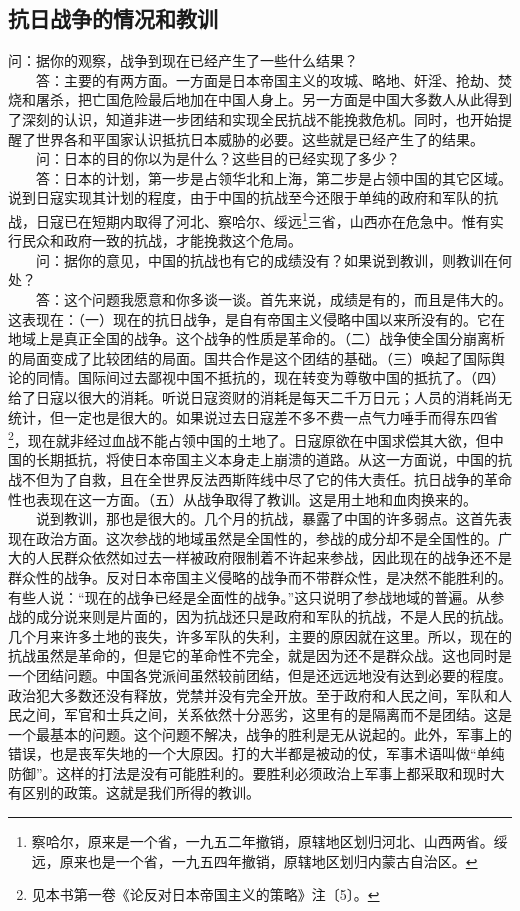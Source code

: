 \documentclass[cn,11pt,chinese]{elegantbook}
\def\myformat#1{\hfil\hfil #1}
\begin{document}
\subsection*{\myformat{抗日战争的情况和教训}}
问：据你的观察，战争到现在已经产生了一些什么结果？\\
　　答：主要的有两方面。一方面是日本帝国主义的攻城、略地、奸淫、抢劫、焚烧和屠杀，把亡国危险最后地加在中国人身上。另一方面是中国大多数人从此得到了深刻的认识，知道非进一步团结和实现全民抗战不能挽救危机。同时，也开始提醒了世界各和平国家认识抵抗日本威胁的必要。这些就是已经产生了的结果。\\
　　问：日本的目的你以为是什么？这些目的已经实现了多少？\\
　　答：日本的计划，第一步是占领华北和上海，第二步是占领中国的其它区域。说到日寇实现其计划的程度，由于中国的抗战至今还限于单纯的政府和军队的抗战，日寇已在短期内取得了河北、察哈尔、绥远\footnote[2]{ 察哈尔，原来是一个省，一九五二年撤销，原辖地区划归河北、山西两省。绥远，原来也是一个省，一九五四年撤销，原辖地区划归内蒙古自治区。}三省，山西亦在危急中。惟有实行民众和政府一致的抗战，才能挽救这个危局。\\
　　问：据你的意见，中国的抗战也有它的成绩没有？如果说到教训，则教训在何处？\\
　　答：这个问题我愿意和你多谈一谈。首先来说，成绩是有的，而且是伟大的。这表现在：（一）现在的抗日战争，是自有帝国主义侵略中国以来所没有的。它在地域上是真正全国的战争。这个战争的性质是革命的。（二）战争使全国分崩离析的局面变成了比较团结的局面。国共合作是这个团结的基础。（三）唤起了国际舆论的同情。国际间过去鄙视中国不抵抗的，现在转变为尊敬中国的抵抗了。（四）给了日寇以很大的消耗。听说日寇资财的消耗是每天二千万日元；人员的消耗尚无统计，但一定也是很大的。如果说过去日寇差不多不费一点气力唾手而得东四省\footnote[3]{ 见本书第一卷《论反对日本帝国主义的策略》注〔5〕。}，现在就非经过血战不能占领中国的土地了。日寇原欲在中国求偿其大欲，但中国的长期抵抗，将使日本帝国主义本身走上崩溃的道路。从这一方面说，中国的抗战不但为了自救，且在全世界反法西斯阵线中尽了它的伟大责任。抗日战争的革命性也表现在这一方面。（五）从战争取得了教训。这是用土地和血肉换来的。\\
　　说到教训，那也是很大的。几个月的抗战，暴露了中国的许多弱点。这首先表现在政治方面。这次参战的地域虽然是全国性的，参战的成分却不是全国性的。广大的人民群众依然如过去一样被政府限制着不许起来参战，因此现在的战争还不是群众性的战争。反对日本帝国主义侵略的战争而不带群众性，是决然不能胜利的。有些人说：“现在的战争已经是全面性的战争。”这只说明了参战地域的普遍。从参战的成分说来则是片面的，因为抗战还只是政府和军队的抗战，不是人民的抗战。几个月来许多土地的丧失，许多军队的失利，主要的原因就在这里。所以，现在的抗战虽然是革命的，但是它的革命性不完全，就是因为还不是群众战。这也同时是一个团结问题。中国各党派间虽然较前团结，但是还远远地没有达到必要的程度。政治犯大多数还没有释放，党禁并没有完全开放。至于政府和人民之间，军队和人民之间，军官和士兵之间，关系依然十分恶劣，这里有的是隔离而不是团结。这是一个最基本的问题。这个问题不解决，战争的胜利是无从说起的。此外，军事上的错误，也是丧军失地的一个大原因。打的大半都是被动的仗，军事术语叫做“单纯防御”。这样的打法是没有可能胜利的。要胜利必须政治上军事上都采取和现时大有区别的政策。这就是我们所得的教训。\\
\end{document}
